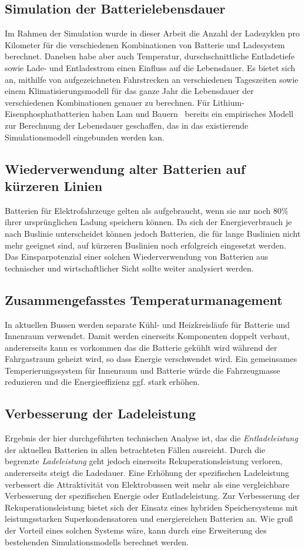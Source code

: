 \subsection{Simulation der Batterielebensdauer}
Im Rahmen der Simulation wurde in dieser Arbeit die Anzahl der Ladezyklen pro Kilometer für die verschiedenen Kombinationen von Batterie und Ladesystem berechnet. Daneben habe aber auch Temperatur, durschschnittliche Entladetiefe sowie Lade- und Entladestrom einen Einfluss auf die Lebensdauer. Es bietet sich an, mithilfe von aufgezeichneten Fahrstrecken an verschiedenen Tageszeiten sowie einem Klimatisierungsmodell für das ganze Jahr die Lebensdauer der verschiedenen Kombinationen genauer zu berechnen. Für Lithium-Eisenphosphatbatterien haben Lam und Bauern~\cite{lam2013practical} bereits ein empirisches Modell zur Berechnung der Lebensdauer geschaffen, das in das existierende Simulationsmodell eingebunden werden kan.

\subsection{Wiederverwendung alter Batterien auf kürzeren Linien}
Batterien für Elektrofahrzeuge gelten als aufgebraucht, wenn sie nur noch 80\% ihrer ursprünglichen Ladung speichern können. Da sich der Energieverbrauch je nach Buslinie unterscheidet können jedoch Batterien, die für lange Buslinien nicht mehr geeignet sind, auf kürzeren Buslinien noch erfolgreich eingesetzt werden. Das Einsparpotenzial einer solchen Wiederverwendung von Batterien aus technischer und wirtschaftlicher Sicht sollte weiter analysiert werden.

\subsection{Zusammengefasstes Temperaturmanagement}
In aktuellen Bussen werden separate Kühl- und Heizkreisläufe für Batterie und Innenraum verwendet. Damit werden einerseits Komponenten doppelt verbaut, andererseits kann es vorkommen das die Batterie gekühlt wird während der Fahrgastraum geheizt wird, so dass Energie verschwendet wird. Ein gemeinsames Temperierungssystem für Innenraum und Batterie würde die Fahrzeugmasse reduzieren und die Energieeffizienz ggf. stark erhöhen.

\subsection{Verbesserung der Ladeleistung}
Ergebnis der hier durchgeführten technischen Analyse ist, das die \emph{Entladeleistung} der aktuellen Batterien in allen betrachteten Fällen ausreicht. Durch die begrenzte \emph{Ladeleistung} geht jedoch einerseits Rekuperationsleistung verloren, andererseits steigt die Ladedauer. Eine Erhöhung der spezifischen Ladeleistung verbessert die Attraktivität von Elektrobussen weit mehr als eine vergleichbare Verbesserung der spezifischen Energie oder Entladeleistung. Zur Verbesserung der Rekuperationsleistung bietet sich der Einsatz eines hybriden Speichersystems mit leistungsstarken Superkondensatoren und energiereichen Batterien an. Wie groß der Vorteil eines solchen Systems wäre, kann durch eine Erweiterung des bestehenden Simulationsmodells berechnet werden.